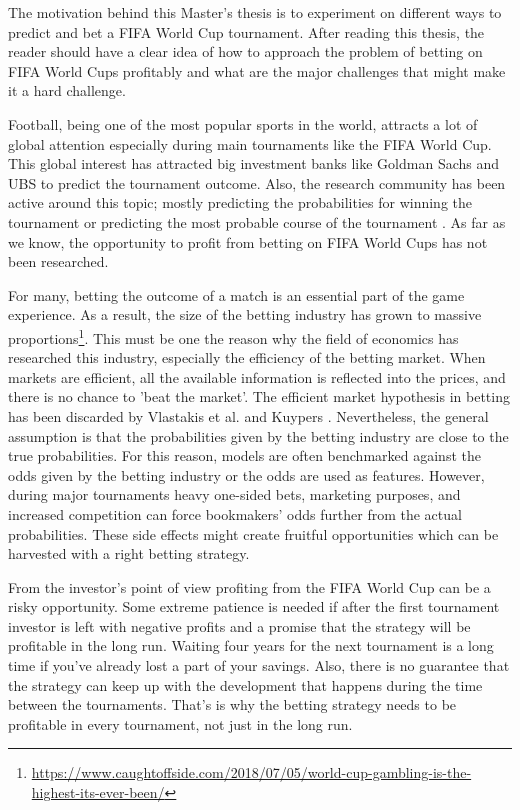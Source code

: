 The motivation behind this Master's thesis is to experiment on different ways to predict and bet a FIFA World Cup tournament. After reading this thesis, the reader should have a clear idea of how to approach the problem of betting on FIFA World Cups profitably and what are the major challenges that might make it a hard challenge.

Football, being one of the most popular sports in the world, attracts a lot of global attention especially during main tournaments like the FIFA World Cup. This global interest has attracted big investment banks like Goldman Sachs and UBS to predict the tournament outcome. Also, the research community has been active around this topic; mostly predicting the probabilities for winning the tournament or predicting the most probable course of the tournament \cite{groll2018prediction, groll2015prediction, leitner2010forecasting}. As far as we know, the opportunity to profit from betting on FIFA World Cups has not been researched.

For many, betting the outcome of a match is an essential part of the game experience. As a result, the size of the betting industry has grown to massive proportions\footnote{\url{https://www.caughtoffside.com/2018/07/05/world-cup-gambling-is-the-highest-its-ever-been/}}. This must be one the reason why the field of economics has researched this industry, especially the efficiency of the betting market. When markets are efficient, all the available information is reflected into the prices, and there is no chance to 'beat the market'. The efficient market hypothesis in betting has been discarded by Vlastakis et al. \cite{vlastakis2009efficient} and Kuypers \cite{kuypers2008}. Nevertheless, the general assumption is that the probabilities given by the betting industry are close to the true probabilities. For this reason, models are often benchmarked against the odds given by the betting industry or the odds are used as features. \cite{leitner2010forecasting} However, during major tournaments heavy one-sided bets, marketing purposes, and increased competition can force bookmakers' odds further from the actual probabilities. These side effects might create fruitful opportunities which can be harvested with a right betting strategy.

From the investor's point of view profiting from the FIFA World Cup can be a risky opportunity. Some extreme patience is needed if after the first tournament investor is left with negative profits and a promise that the strategy will be profitable in the long run. Waiting four years for the next tournament is a long time if you've already lost a part of your savings. Also, there is no guarantee that the strategy can keep up with the development that happens during the time between the tournaments. That's is why the betting strategy needs to be profitable in every tournament, not just in the long run.

